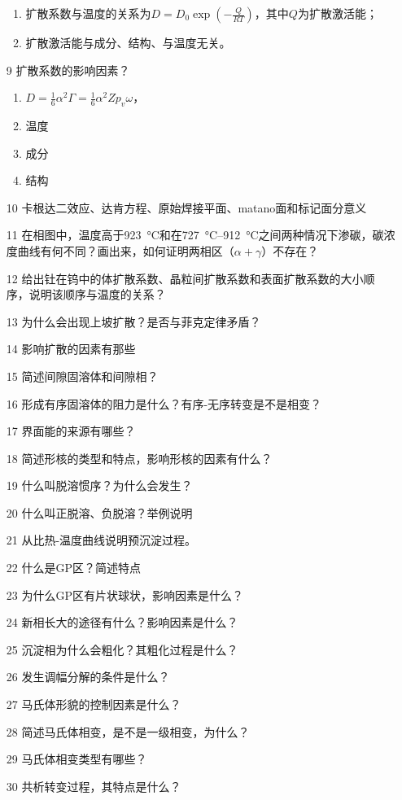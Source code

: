 \begin{enumerate}
\begin{enumerate}
            \item 扩散系数与温度的关系为$D=D_0\exp\left( -\frac{Q}{RT} \right)$，其中$Q$为扩散激活能；
            \item 扩散激活能与成分、结构、与温度无关。
        \end{enumerate} 
        \item[9] 扩散系数的影响因素？
        \begin{enumerate}
            \item $D=\frac{1}{6}\alpha^2\Gamma=\frac{1}{6}\alpha^2Zp_v\omega$，
            \item 温度
            \item 成分
            \item 结构
        \end{enumerate} 
        \item[10] 卡根达二效应、达肯方程、原始焊接平面、matano面和标记面分意义
        \item[11] 在相图中，温度高于\SI{923}{\celsius}和在\SIrange{727}{912}{\celsius}之间两种情况下渗碳，碳浓度曲线有何不同？画出来，如何证明两相区（$\alpha+\gamma$）不存在？
        \item[12] 给出钍在钨中的体扩散系数、晶粒间扩散系数和表面扩散系数的大小顺序，说明该顺序与温度的关系？
        \item[13] 为什么会出现上坡扩散？是否与菲克定律矛盾？
        \item[14] 影响扩散的因素有那些
        \item[15] 简述间隙固溶体和间隙相？
        \item[16] 形成有序固溶体的阻力是什么？有序-无序转变是不是相变？
        \item[17] 界面能的来源有哪些？
        \item[18] 简述形核的类型和特点，影响形核的因素有什么？
        \item[19] 什么叫脱溶惯序？为什么会发生？
        \item[20] 什么叫正脱溶、负脱溶？举例说明
        \item[21] 从比热-温度曲线说明预沉淀过程。
        \item[22] 什么是GP区？简述特点
        \item[23] 为什么GP区有片状球状，影响因素是什么？
        \item[24] 新相长大的途径有什么？影响因素是什么？
        \item[25] 沉淀相为什么会粗化？其粗化过程是什么？
        \item[26] 发生调幅分解的条件是什么？
        \item[27] 马氏体形貌的控制因素是什么？
        \item[28] 简述马氏体相变，是不是一级相变，为什么？
        \item[29] 马氏体相变类型有哪些？
        \item[30] 共析转变过程，其特点是什么？
    \end{enumerate}